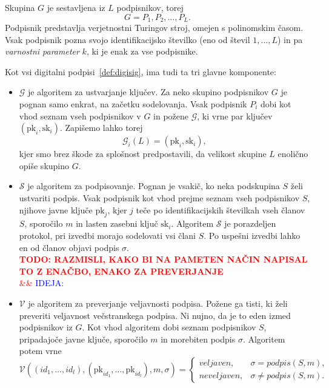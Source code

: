 \documentclass[isrm2, tisk]{fmfdelo}
\newcommand{\todo}[2][]{%
    \textcolor{red}{%
        \\ \textbf{\uppercase{todo: #2}}%
        \\%
        \ifx&#1&%
        \else%
            \textcolor{blue}{\uppercase{ideja:} #1}%
            \\%
        \fi%
    }%
}
\begin{document}
\begin{definicija} 
    Skupina $G$ je sestavljena iz $L$ podpisnikov, torej
    $$ 
    G = P_1, P_2, \dots, P_L.
    $$
    Podpisnik predstavlja verjetnostni Turingov stroj, omejen s polinomskim časom. Vsak podpisnik pozna 
    svojo identifikacijsko številko (eno od števil $1, \dots, L$) in pa \textit{varnostni parameter} $k$, 
    ki je enak za vse podpisnike.

    Kot vsi digitalni podpisi~\ref{def:digisig}, ima tudi ta tri glavne komponente: 
    \begin{itemize}
        \item $\mathcal{G}$ je algoritem za ustvarjanje ključev. Za neko skupino podpisnikov $G$ je pognan samo 
            enkrat, na začetku sodelovanja. Vsak podpisnik $P_i$ dobi kot vhod seznam vseh podpisnikov v $G$ 
            in požene $\mathcal{G}$, ki vrne par ključev $(\text{pk}_i, \text{sk}_i)$. Zapišemo lahko torej 
            $$ 
            \mathcal{G}_i(L) = (\text{pk}_i, \text{sk}_i),
            $$
            kjer smo brez škode za splošnost predpostavili, da velikost skupine $L$ enolično opiše 
            skupino $G$.
        \item $\mathcal{S}$ je algoritem za podpisovanje. Pognan je vsakič, ko neka podskupina $S$ želi 
            ustvariti podpis. Vsak podpisnik kot vhod prejme seznam vseh podpisnikov $S$, njihove 
            javne ključe $\text{pk}_j$, kjer $j$ teče po identifikacijskih številkah vseh članov $S$, 
            sporočilo $m$ in lasten zasebni ključ $\text{sk}_i$. Algoritem $\mathcal{S}$ je porazdeljen 
            protokol, pri izvedbi morajo sodelovati vsi člani $S$. Po uspešni izvedbi lahko en od članov 
            objavi podpis $\sigma$.
            \todo{razmisli, kako bi na pameten način napisal to z enačbo, enako za preverjanje}
        \item $\mathcal{V}$ je algoritem za preverjanje veljavnosti podpisa. Požene ga tisti, ki želi 
            preveriti veljavnost večstranskega podpisa. Ni nujno, da je to eden izmed podpisnikov iz $G$. 
            Kot vhod algoritem dobi seznam podpisnikov $S$, pripadajoče javne ključe, sporočilo $m$ in 
            morebiten podpis $\sigma$. Algoritem potem vrne
            $$ 
            \mathcal{V}((id_1, \dots, id_l), (\text{pk}_{id_1}, \dots, \text{pk}_{id_l}), m, \sigma) = 
            \begin{cases}
                veljaven, & \sigma = podpis(S, m), \\
                neveljaven, & \sigma \neq podpis(S, m).
            \end{cases}
            $$
    \end{itemize}
\end{definicija}
\end{document}
